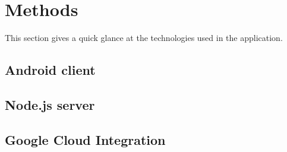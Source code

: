 \section{Methods}
This section gives a quick glance at the technologies used in the application.

\subsection{Android client}

\subsection{Node.js server}

\subsection{Google Cloud Integration}
